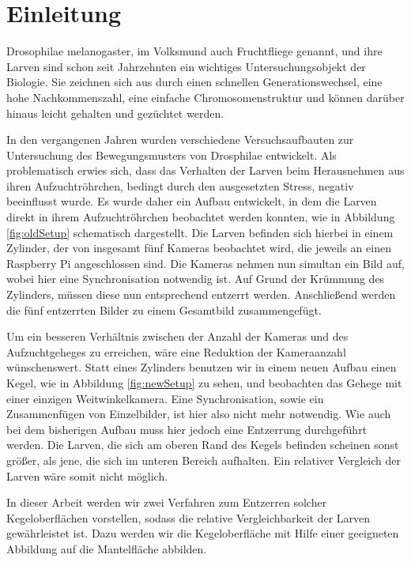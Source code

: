 \chapter{Einleitung}
Drosophilae melanogaster, im Volksmund auch Fruchtfliege genannt, und ihre Larven sind schon seit Jahrzehnten ein wichtiges Untersuchungsobjekt der Biologie. Sie zeichnen sich aus durch einen schnellen Generationswechsel, eine hohe Nachkommenszahl, eine einfache Chromosomenstruktur und können darüber hinaus leicht gehalten und gezüchtet werden.

In den vergangenen Jahren wurden verschiedene Versuchsaufbauten zur Untersuchung des Bewegungsmusters von Drosphilae entwickelt. 
Als problematisch erwies sich, dass das Verhalten der Larven beim Herausnehmen aus ihren Aufzuchtröhrchen, bedingt durch den ausgesetzten Stress, negativ beeinflusst wurde. 
Es wurde daher ein Aufbau entwickelt, in dem die Larven direkt in ihrem Aufzuchtröhrchen beobachtet werden konnten, wie in Abbildung \ref{fig:oldSetup} schematisch dargestellt.
Die Larven befinden sich hierbei in einem Zylinder, der von insgesamt fünf Kameras beobachtet wird, die jeweils an einen Raspberry Pi angeschlossen sind. Die Kameras nehmen nun simultan ein Bild auf, wobei hier eine Synchronisation notwendig ist. Auf Grund der Krümmung des Zylinders, müssen diese nun entsprechend entzerrt werden. Anschließend werden die fünf entzerrten Bilder zu einem Gesamtbild zusammengefügt. 

Um ein besseren Verhältnis zwischen der Anzahl der Kameras und des Aufzuchtgeheges zu erreichen, wäre eine Reduktion der Kameraanzahl wünschenswert. 
Statt eines Zylinders benutzen wir in einem neuen Aufbau einen Kegel, wie in Abbildung \ref{fig:newSetup} zu sehen, und beobachten das Gehege mit einer einzigen Weitwinkelkamera. Eine Synchronisation, sowie ein Zusammenfügen von Einzelbilder, ist hier also nicht mehr notwendig. 
Wie auch bei dem bisherigen Aufbau muss hier jedoch eine Entzerrung durchgeführt werden. Die Larven, die sich am oberen Rand des Kegels befinden scheinen sonst größer, als jene, die sich im unteren Bereich aufhalten. Ein relativer Vergleich der Larven wäre somit nicht möglich. 

In dieser Arbeit werden wir zwei Verfahren zum Entzerren solcher Kegeloberflächen vorstellen, sodass die relative Vergleichbarkeit der Larven gewährleistet ist. 
Dazu werden wir die Kegeloberfläche mit Hilfe einer geeigneten Abbildung auf die Mantelfläche abbilden. 

